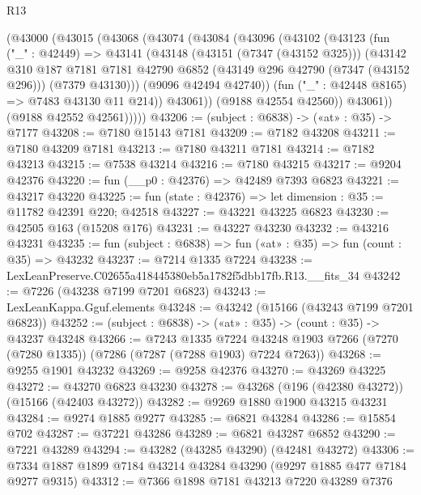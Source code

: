 \begin{lexlean}{R13}
\begin{coremodule}
        (@43000
          (@43015
            (@43068
              (@43074
                (@43084
                  (@43096
                    (@43102
                      (@43123
                        (fun ("_" : @42449) =>
                        @43141
                          (@43148
                            (@43151 (@7347 (@43152 @325)))
                            (@43142
                              @310
                              @187
                              @7181
                              @7181
                              @42790
                              @6852
                              (@43149 @296 @42790 (@7347 (@43152 @296)))
                              (@7379 @43130)))
                          (@9096 @42494 @42740))
                        (fun ("_" : @42448 @8165) => @7483 @43130 @11 @214))
                      @43061))
                  (@9188 @42554 @42560))
                @43061))
            (@9188 @42552 @42561)))))
@43206 := (subject : @6838) -> («at» : @35) -> @7177
@43208 := @7180 @15143 @7181
@43209 := @7182 @43208
@43211 := @7180 @43209 @7181
@43213 := @7180 @43211 @7181
@43214 := @7182 @43213
@43215 := @7538 @43214
@43216 := @7180 @43215
@43217 := @9204 @42376
@43220 := fun (__p0 : @42376) => @42489 @7393 @6823
@43221 := @43217 @43220
@43225 := fun (state : @42376) => let dimension : @35 := @11782 @42391 @220; @42518
@43227 := @43221 @43225 @6823
@43230 := @42505 @163 (@15208 @176)
@43231 := @43227 @43230
@43232 := @43216 @43231
@43235 := fun (subject : @6838) => fun («at» : @35) => fun (count : @35) => @43232
@43237 := @7214 @1335 @7224
@43238 := LexLeanPreserve.C02655a418445380eb5a1782f5dbb17fb.R13.__fits_34
@43242 := @7226 (@43238 @7199 @7201 @6823)
@43243 := LexLeanKappa.Gguf.elements
@43248 := @43242 (@15166 (@43243 @7199 @7201 @6823))
@43252 := (subject : @6838) -> («at» : @35) -> (count : @35) -> @43237 @43248
@43266 := @7243
    @1335
    @7224
    @43248
    @1903
    @7266
    (@7270 (@7280 @1335))
    (@7286 (@7287 (@7288 @1903) @7224 @7263))
@43268 := @9255 @1901 @43232
@43269 := @9258 @42376
@43270 := @43269 @43225
@43272 := @43270 @6823 @43230
@43278 := @43268 (@196 (@42380 @43272)) (@15166 (@42403 @43272))
@43282 := @9269 @1880 @1900 @43215 @43231
@43284 := @9274 @1885 @9277
@43285 := @6821 @43284
@43286 := @15854 @702
@43287 := @37221 @43286
@43289 := @6821 @43287 @6852
@43290 := @7221 @43289
@43294 := @43282 (@43285 @43290) (@42481 @43272)
@43306 := @7334 @1887 @1899 @7184 @43214 @43284 @43290 (@9297 @1885 @477 @7184 @9277 @9315)
@43312 := @7366 @1898 @7181 @43213 @7220 @43289 @7376

\end{coremodule}
\end{lexlean}
